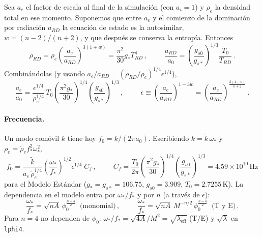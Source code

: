 \documentclass[11pt]{article}
\begin{document}
            Sea $a_e$ el factor de escala al final de la simulación (con $a_i = 1$) y $\rho_e$ la densidad total en ese momento. Suponemos que entre $a_e$ y el comienzo de la dominación por radiación $a_{RD}$ la ecuación de estado es la autosimilar, $w = (n-2)/(n+2)$, y que después se conserva la entropía. Entonces
            \begin{equation}
                \rho_{RD} = \rho_e \left( \frac{a_e}{a_{RD}} \right)^{3(1+w)} = \frac{\pi^2}{30} g_* T_{RD}^4 \, ,
                \hspace{1cm}
                \frac{a_{RD}}{a_0} = \left( \frac{g_{s0}}{g_{s*}} \right)^{1/3} \frac{T_0}{T_{RD}} \, .
            \end{equation}
            Combinándolas (y usando $a_e/a_{RD} = (\rho_{RD}/\rho_e)^{1/4} \epsilon^{1/4}$),
            \begin{equation}
                \frac{a_e}{a_0} = \frac{\epsilon^{1/4}}{\rho_e^{1/4}} \, T_0 \left( \frac{\pi^2 g_*}{30} \right)^{1/4} \left( \frac{g_{s0}}{g_{s*}} \right)^{1/3} \, ,
                \hspace{1cm}
                \epsilon \equiv \left( \frac{a_e}{a_{RD}} \right)^{1 - 3w} = \left( \frac{a_e}{a_{RD}} \right)^{\frac{2(4-n)}{n+2}} \, .
            \end{equation}
            \paragraph{Frecuencia.} Un modo comóvil $k$ tiene hoy $f_0 = k/(2\pi a_0)$. Escribiendo $k = \tilde k \, \omega_*$ y $\rho_e = \tilde\rho_e f_*^2 \omega_*^2$,
            \begin{equation}
                \boxed{
                f_0 = \frac{\tilde k}{a_e \, \tilde\rho_e^{1/4}} \left( \frac{\omega_*}{f_*} \right)^{1/2} \epsilon^{1/4} \; C_f \, ,
                \hspace{1cm}
                C_f = \frac{T_0}{2\pi} \left( \frac{\pi^2 g_*}{30} \right)^{1/4} \left( \frac{g_{s0}}{g_{s*}} \right)^{1/3} = 4.59 \times 10^{10}\,\text{Hz}
                }
            \end{equation}
            para el Modelo Estándar ($g_* = g_{s*} = 106.75$, $g_{s0} = 3.909$, $T_0 = 2.7255$\,K). La dependencia en el modelo entra por $\omega_*/f_*$ y por $n$ (a través de $\epsilon$):
            \begin{equation}
                \frac{\omega_*}{f_*} = \sqrt{nA} \, \phi_0^{\frac{n-4}{2}} \;\; \text{(monomial)} \, ,
                \hspace{1cm}
                \frac{\omega_*}{f_*} = \sqrt{nA} \, M^{-n/2} \, \phi_0^{\frac{n-4}{2}} \;\; \text{(T y E)} \, .
            \end{equation}
            Para $n = 4$ no dependen de $\phi_0$: $\omega_*/f_* = \sqrt{4A}/M^2 = \sqrt{\lambda_{\text{eff}}}$ (T/E) y $\sqrt{\lambda}$ en \texttt{lphi4}.
\end{document}
